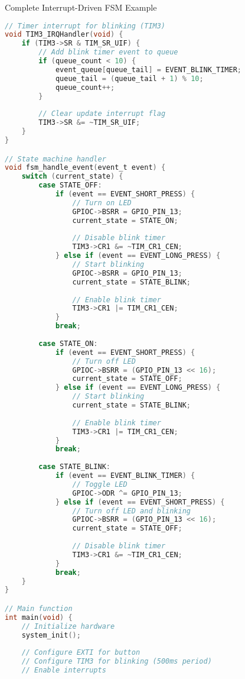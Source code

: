 \begin{example2}{Complete Interrupt-Driven FSM Example}
\begin{lstlisting}[language=C, style=basesmol]
// Timer interrupt for blinking (TIM3)
void TIM3_IRQHandler(void) {
    if (TIM3->SR & TIM_SR_UIF) {
        // Add blink timer event to queue
        if (queue_count < 10) {
            event_queue[queue_tail] = EVENT_BLINK_TIMER;
            queue_tail = (queue_tail + 1) % 10;
            queue_count++;
        }
        
        // Clear update interrupt flag
        TIM3->SR &= ~TIM_SR_UIF;
    }
}

// State machine handler
void fsm_handle_event(event_t event) {
    switch (current_state) {
        case STATE_OFF:
            if (event == EVENT_SHORT_PRESS) {
                // Turn on LED
                GPIOC->BSRR = GPIO_PIN_13;
                current_state = STATE_ON;
                
                // Disable blink timer
                TIM3->CR1 &= ~TIM_CR1_CEN;
            } else if (event == EVENT_LONG_PRESS) {
                // Start blinking
                GPIOC->BSRR = GPIO_PIN_13;
                current_state = STATE_BLINK;
                
                // Enable blink timer
                TIM3->CR1 |= TIM_CR1_CEN;
            }
            break;
            
        case STATE_ON:
            if (event == EVENT_SHORT_PRESS) {
                // Turn off LED
                GPIOC->BSRR = (GPIO_PIN_13 << 16);
                current_state = STATE_OFF;
            } else if (event == EVENT_LONG_PRESS) {
                // Start blinking
                current_state = STATE_BLINK;
                
                // Enable blink timer
                TIM3->CR1 |= TIM_CR1_CEN;
            }
            break;
            
        case STATE_BLINK:
            if (event == EVENT_BLINK_TIMER) {
                // Toggle LED
                GPIOC->ODR ^= GPIO_PIN_13;
            } else if (event == EVENT_SHORT_PRESS) {
                // Turn off LED and blinking
                GPIOC->BSRR = (GPIO_PIN_13 << 16);
                current_state = STATE_OFF;
                
                // Disable blink timer
                TIM3->CR1 &= ~TIM_CR1_CEN;
            }
            break;
    }
}

// Main function
int main(void) {
    // Initialize hardware
    system_init();
    
    // Configure EXTI for button
    // Configure TIM3 for blinking (500ms period)
    // Enable interrupts
    

\end{lstlisting}
\end{example2}
